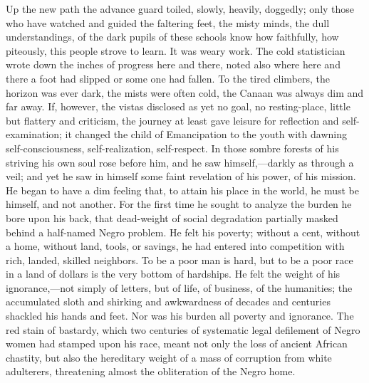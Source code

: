 Up the new path the advance guard toiled, slowly, heavily,
doggedly; only those who have watched and guided the faltering feet,
the misty minds, the dull understandings, of the dark pupils of these
schools know how faithfully, how piteously, this people strove to
learn. It was weary work. The cold statistician wrote down the inches
of progress here and there, noted also where here and there a foot had
slipped or some one had fallen. To the tired climbers, the horizon was
ever dark, the mists were often cold, the Canaan was always dim and
far away. If, however, the vistas disclosed as yet no goal, no
resting-place, little but flattery and criticism, the journey at least
gave leisure for reflection and self-examination; it changed the child
of Emancipation to the youth with dawning self-consciousness,
self-realization, self-respect. In those sombre forests of his
striving his own soul rose before him, and he saw
him\-self,---dark\-ly as through a veil; and yet he saw in himself
some faint revelation of his power, of his mission. He began to have a
dim feeling that, to attain his place in the world, he must be
himself, and not another. For the first time he sought to analyze the
burden he bore upon his back, that dead-weight of social degradation
partially masked behind a half-named Negro problem. He felt his
poverty; without a cent, without a home, without land, tools, or
savings, he had entered into competition with rich, landed, skilled
neighbors. To be a poor man is hard, but to be a poor race in a land
of dollars is the very bottom of hardships. He felt the weight of his
ignorance,---not simply of letters, but of life, of  business,
of the humanities; the accumulated sloth and shirking and awkwardness
of decades and centuries shackled his hands and feet. Nor was his
burden all poverty and ignorance. The red stain of bastardy, which two
centuries of systematic legal defilement of Negro women had stamped
upon his race, meant not only the loss of ancient African chastity,
but also the hereditary weight of a mass of corruption from white
adulterers, threatening almost the obliteration of the Negro home.

